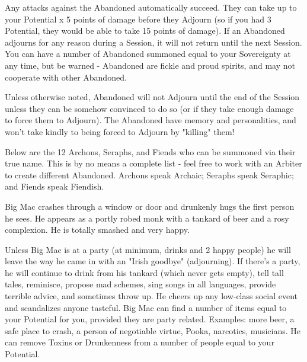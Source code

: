 Any attacks against the Abandoned automatically succeed.  They can take up to your Potential x 5 points of damage before they Adjourn (so if you had 3 Potential, they would be able to take 15 points of damage).  If an Abandoned adjourns for any reason during a Session, it will not return until the next Session. You can have a number of Abandoned summoned equal to your Sovereignty at any time, but be warned - Abandoned are fickle and proud spirits, and may not cooperate with other Abandoned.

Unless otherwise noted, Abandoned will not Adjourn until the end of the Session unless they can be somehow convinced to do so (or if they take enough damage to force them to Adjourn).  The Abandoned have memory and personalities, and won't take kindly to being forced to Adjourn by "killing" them!

Below are the 12 Archons, Seraphs, and Fiends who can be summoned via their true name.  This is by no means a complete list - feel free to work with an Arbiter to create different Abandoned.  Archons speak Archaic; Seraphs speak Seraphic; and Fiends speak Fiendish.


\newpage







Big Mac crashes through a window or door and drunkenly hugs the first person he sees. He appears as a portly robed monk with a tankard of beer and a rosy complexion.  He is totally smashed and very happy.  

Unless Big Mac is at a party (at minimum, drinks and 2 happy people) he will leave the way he came in with an "Irish goodbye" (adjourning).  If there's a party, he will continue to drink from his tankard (which never gets empty), tell tall tales, reminisce, propose mad schemes, sing songs in all languages, provide terrible advice, and sometimes throw up.  He cheers up any low-class social event and scandalizes anyone tasteful. Big Mac can find a number of items equal to your Potential for you, provided they are party related.  Examples:  more beer, a safe place to crash, a person of negotiable virtue, Pooka, narcotics, musicians.  He can remove Toxins or Drunkenness from a number of people equal to your Potential.

